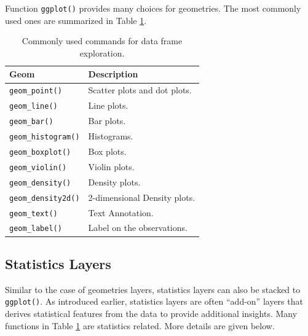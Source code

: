 Function \verb|ggplot()| provides many choices for geometries. The most commonly used ones are summarized in Table \ref{ch:r1:tab:geoms}.
\begin{table}
  \centering \caption{Commonly used commands for data frame exploration.}\label{ch:r1:tab:geoms}
  \begin{tabularx}{\textwidth}{lX}
    \hline
    \textbf{Geom} & \textbf{Description} \\ \hline
    \verb|geom_point()|   & Scatter plots and dot plots. \\
    \verb|geom_line()|    & Line plots.   \\
    \verb|geom_bar()|     & Bar plots. \\
    \verb|geom_histogram()| & Histograms. \\
    \verb|geom_boxplot()| & Box plots. \\
    \verb|geom_violin()| & Violin plots.\\
    \verb|geom_density()| & Density plots.\\
    \verb|geom_density2d()| & 2-dimensional Density plots.\\
    \verb|geom_text()| & Text Annotation.\\
    \verb|geom_label()| & Label on the observations.\\ \hline
    \end{tabularx}
\end{table}

\subsection{Statistics Layers}

Similar to the case of geometries layers, statistics layers can also be stacked to \verb|ggplot()|. As introduced earlier, statistics layers are often ``add-on'' layers that derives statistical features from the data to provide additional insights. Many functions in Table \ref{ch:r1:tab:geoms} are statistics related. More details are given below.

